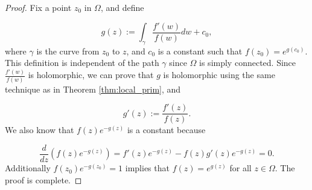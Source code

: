 \documentclass{article}
\begin{document}
\begin{proof}
Fix a point $z_0$ in $\Omega$, and define

\begin{equation*}
g(z):=\int_\gamma \frac{f'(w)}{f(w)}dw+c_0,
\end{equation*}
where $\gamma$ is the curve from $z_0$ to $z$, and $c_0$ is a constant such that $f(z_0)=e^{g(c_0)}$. This definition is independent of the path $\gamma$ since $\Omega$ is simply connected. Since $\frac{f'(w)}{f(w)}$ is holomorphic, we can prove that $g$ is holomorphic using the same technique as in Theorem \ref{thm:local_prim}, and 

\begin{equation*}
g'(z):=\frac{f'(z)}{f(z)}.
\end{equation*}
We also know that $f(z)e^{-g(z)}$ is a constant because 

\begin{equation*}
\frac{d}{dz}(f(z)e^{-g(z)})=f'(z)e^{-g(z)}-f(z)g'(z)e^{-g(z)}=0.
\end{equation*}
Additionally $f(z_0)e^{-g(z_0)}=1$ implies that $f(z)=e^{g(z)}$ for all $z\in\Omega$. The proof is complete. 


\end{proof}
\end{document}
